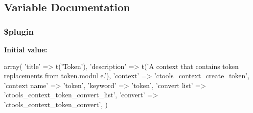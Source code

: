 \subsection{Variable Documentation}
\hypertarget{contexts_2token_8inc_ada8a7130088351710bb02ed622d6bf65}{
\subsubsection[{\$plugin}]{\setlength{\rightskip}{0pt plus 5cm}\$plugin}}
\label{contexts_2token_8inc_ada8a7130088351710bb02ed622d6bf65}
{\bfseries Initial value:}
\begin{DoxyCode}
 array(
  'title' => t('Token'),
  'description' => t('A context that contains token replacements from token.modul
      e.'),
  'context' => 'ctools_context_create_token',  
  'context name' => 'token',
  'keyword' => 'token',
  'convert list' => 'ctools_context_token_convert_list',
  'convert' => 'ctools_context_token_convert',
)
\end{DoxyCode}
